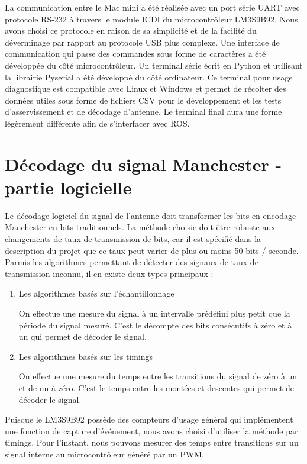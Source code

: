 La communication entre le Mac mini a été réalisée avec un port série UART avec protocole RS-232 à travers le module ICDI du microcontrôleur LM3S9B92. Nous avons choisi ce protocole en raison de sa simplicité et de la facilité du déverminage par rapport au protocole USB plus complexe. Une interface de communication qui passe des commandes sous forme de caractères a été développée du côté microcontrôleur. Un terminal série écrit en Python et utilisant la librairie Pyserial a été développé du côté ordinateur. Ce terminal pour usage diagnostique est compatible avec Linux et Windows et permet de récolter des données utiles sous forme de fichiers CSV pour le développement et les tests d'asservissement et de décodage d'antenne. Le terminal final aura une forme légèrement différente afin de s'interfacer avec ROS.

\section{Décodage du signal Manchester - partie logicielle}

Le décodage logiciel du signal de l'antenne doit transformer les bits en encodage Manchester en bits traditionnels. La méthode choisie doit être robuste aux changements de taux de transmission de bits, car il est spécifié dans la description du projet que ce taux peut varier de plus ou moins 50 bits / seconde. Parmis les algorithmes permettant de détecter des signaux de taux de transmission inconnu, il en existe deux types principaux : 

\begin{enumerate}
\item{Les algorithmes basés sur l'échantillonnage}

On effectue une mesure du signal à un intervalle prédéfini plus petit que la période du signal mesuré. C'est le décompte des bits consécutifs à zéro et à un qui permet de décoder le signal.

\item{Les algorithmes basés sur les timings} 

On effectue une mesure du temps entre les transitions du signal de zéro à un et de un à zéro. C'est le temps entre les montées et descentes qui permet de décoder le signal.
\end{enumerate}

Puisque le LM3S9B92 possède des compteurs d'usage général qui implémentent une fonction de capture d'événement, nous avons choisi d'utiliser la méthode par timings. Pour l'instant, nous pouvons mesurer des temps entre transitions sur un signal interne au microcontrôleur généré par un PWM.


